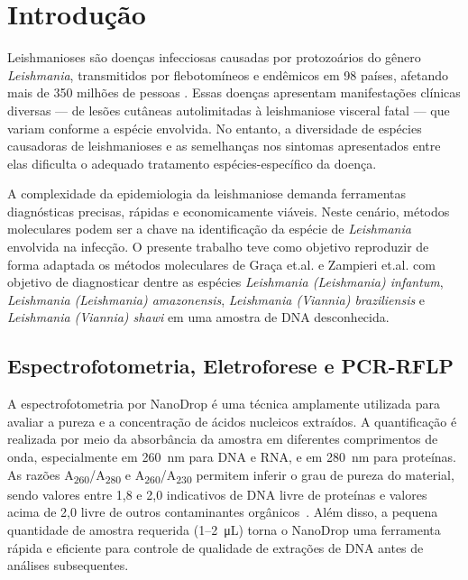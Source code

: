 \section{Introdução}

Leishmanioses são doenças infecciosas causadas por protozoários do gênero
\textit{Leishmania}, transmitidos por flebotomíneos e endêmicos em 98 países,
afetando mais de 350 milhões de pessoas \cite{hong2020one}. Essas doenças
apresentam manifestações clínicas diversas — de lesões cutâneas autolimitadas à
leishmaniose visceral fatal — que variam conforme a espécie envolvida. No
entanto, a diversidade de espécies causadoras de leishmanioses e as semelhanças
nos sintomas apresentados entre elas dificulta o adequado tratamento
espécies-específico da doença.

A complexidade da epidemiologia da leishmaniose demanda ferramentas diagnósticas
precisas, rápidas e economicamente viáveis.  Neste cenário, métodos moleculares
podem ser a chave na identificação da espécie de \textit{Leishmania} envolvida
na infecção. O presente trabalho teve como objetivo reproduzir de forma adaptada
os métodos moleculares de Graça
et.al.\cite{RFLPgraca2012} e Zampieri et.al.\cite{HRMzampi2016} com objetivo de
diagnosticar dentre as espécies \textit{Leishmania (Leishmania) infantum},
\textit{Leishmania (Leishmania) amazonensis}, \textit{Leishmania (Viannia)
braziliensis} e \textit{Leishmania (Viannia)
shawi} em uma amostra de DNA desconhecida. 

\subsection{Espectrofotometria, Eletroforese e PCR-RFLP}

A espectrofotometria por NanoDrop é uma técnica amplamente utilizada para avaliar a pureza e a 
concentração de ácidos nucleicos extraídos. A quantificação é realizada por meio da absorbância da 
amostra em diferentes comprimentos de onda, especialmente em \SI{260}{\nano\meter} para DNA e RNA, 
e em \SI{280}{\nano\meter} para proteínas. As razões A\textsubscript{260}/A\textsubscript{280} e A\textsubscript{260}/A\textsubscript{230} permitem 
inferir o grau de pureza do material, sendo valores entre 1{,}8 e 2{,}0 indicativos de DNA livre de proteínas 
e valores acima de 2{,}0 livre de outros contaminantes orgânicos~\cite{nanodrop}. Além disso, a pequena quantidade de amostra requerida (1–2~\si{\micro\liter}) 
torna o NanoDrop uma ferramenta rápida e eficiente para controle de qualidade de extrações de DNA antes de análises subsequentes.

